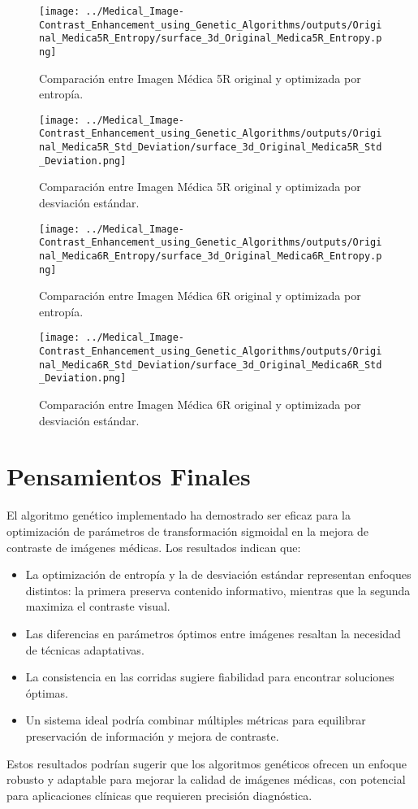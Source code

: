 \begin{figure}[H]
    \centering
    \texttt{[image: ../Medical\_Image-Contrast\_Enhancement\_using\_Genetic\_Algorithms/outputs/Original\_Medica5R\_Entropy/surface\_3d\_Original\_Medica5R\_Entropy.png]}
    \caption{Comparación entre Imagen Médica 5R original y optimizada por entropía.}
    \label{fig:comparacion_5R_Entropia}
\end{figure}

\begin{figure}[H]
    \centering
    \texttt{[image: ../Medical\_Image-Contrast\_Enhancement\_using\_Genetic\_Algorithms/outputs/Original\_Medica5R\_Std\_Deviation/surface\_3d\_Original\_Medica5R\_Std\_Deviation.png]}
    \caption{Comparación entre Imagen Médica 5R original y optimizada por desviación estándar.}
    \label{fig:comparacion_5R_std}
\end{figure}

\begin{figure}[H]
    \centering
    \texttt{[image: ../Medical\_Image-Contrast\_Enhancement\_using\_Genetic\_Algorithms/outputs/Original\_Medica6R\_Entropy/surface\_3d\_Original\_Medica6R\_Entropy.png]}
    \caption{Comparación entre Imagen Médica 6R original y optimizada por entropía.}
    \label{fig:comparacion_6R_Entropia}
\end{figure}

\begin{figure}[H]
    \centering
    \texttt{[image: ../Medical\_Image-Contrast\_Enhancement\_using\_Genetic\_Algorithms/outputs/Original\_Medica6R\_Std\_Deviation/surface\_3d\_Original\_Medica6R\_Std\_Deviation.png]}
    \caption{Comparación entre Imagen Médica 6R original y optimizada por desviación estándar.}
    \label{fig:comparacion_6R_std}
\end{figure}

\newpage
\section{Pensamientos Finales}

El algoritmo genético implementado ha demostrado ser eficaz para la optimización de parámetros de transformación sigmoidal en la mejora de contraste de imágenes médicas. Los resultados indican que:

\begin{itemize}
    \item La optimización de entropía y la de desviación estándar representan enfoques distintos: la primera preserva contenido informativo, mientras que la segunda maximiza el contraste visual.
    \item Las diferencias en parámetros óptimos entre imágenes resaltan la necesidad de técnicas adaptativas.
    \item La consistencia en las corridas sugiere fiabilidad para encontrar soluciones óptimas.
    \item Un sistema ideal podría combinar múltiples métricas para equilibrar preservación de información y mejora de contraste.
\end{itemize}

Estos resultados podrían sugerir que los algoritmos genéticos ofrecen un enfoque robusto y adaptable para mejorar la calidad de imágenes médicas, con potencial para aplicaciones clínicas que requieren precisión diagnóstica.